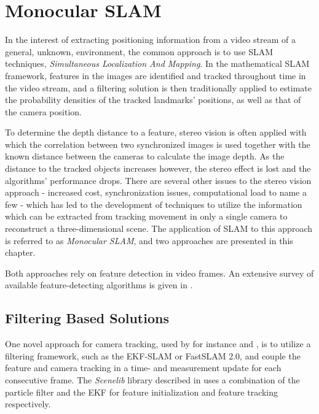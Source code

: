 \chapter{Monocular SLAM}
\label{cha:monoslam}
    In the interest of extracting positioning information from a video stream
    of a general, unknown, environment, the common approach is to use SLAM techniques,
    \textit{Simultaneous Localization And Mapping}.
    In the mathematical SLAM framework, features in the images are identified
    and tracked throughout time in the video stream, and a filtering solution
    is then traditionally applied to estimate the probability densities
    of the tracked landmarks' positions, as well as that of the camera position.

    To determine the depth distance to a feature, stereo vision is often applied
    with which the correlation between two synchronized images is used together with the known
    distance between the cameras to calculate the image depth.
    As the distance to the tracked objects increases however, the stereo
    effect is lost and the algorithms' performance drops.
    There are several other issues to the stereo vision approach - increased
    cost, synchronization issues, computational load to name a few - which has
    led to the development of techniques to utilize the information which can be extracted
    from tracking movement in only a single camera to reconstruct a three-dimensional scene.
    The application of SLAM to this approach is referred to as \textit{Monocular SLAM},
    and two approaches are presented in this chapter.

    Both approaches rely on feature detection in video frames.
    An extensive survey of available feature-detecting algorithms
    is given in \citep{idris09reviewoffeaturedetection}.

    \section{Filtering Based Solutions}
        \label{sec:video:filtersolutions}
        One novel approach for camera tracking, used by for instance \citep{DBLP:conf/iccv/Davison03} and \citep{Eade:2006:SMS:1153170.1153506},
        is to utilize a filtering framework, such as the EKF-SLAM or FastSLAM 2.0,
        and couple the feature and camera tracking in a time- and measurement
        update for each consecutive frame.
        The \textit{Scenelib} library described in \citep{DBLP:conf/iccv/Davison03}
        uses a combination of the particle filter and the EKF for feature initialization
        and feature tracking respectively.

